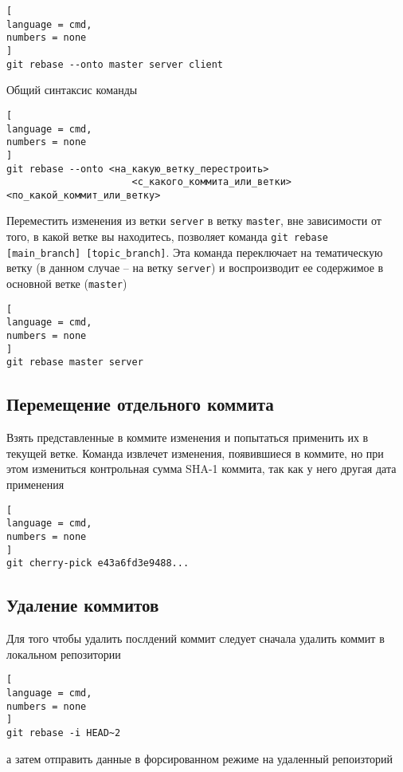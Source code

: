 \documentclass[%
	11pt,
	a4paper,
	utf8,
		]{article}
\begin{document}
\begin{lstlisting}[
language = cmd,
numbers = none
]
git rebase --onto master server client
\end{lstlisting}

Общий синтаксис команды
\begin{lstlisting}[
language = cmd,
numbers = none
]
git rebase --onto <на_какую_ветку_перестроить>
                      <с_какого_коммита_или_ветки> <по_какой_коммит_или_ветку>
\end{lstlisting}

Переместить изменения из ветки \texttt{server} в ветку \texttt{master}, вне зависимости от того, в какой ветке вы находитесь, позволяет команда \texttt{git rebase [main\_branch] [topic\_branch]}. Эта команда переключает на тематическую ветку (в данном случае -- на ветку \texttt{server}) и воспроизводит ее содержимое в основной ветке (\texttt{master})

\begin{lstlisting}[
language = cmd,
numbers = none
]
git rebase master server
\end{lstlisting}


\subsection{Перемещение отдельного коммита}

Взять представленные в коммите изменения и попытаться применить их в текущей ветке. Команда извлечет изменения, появившиеся в коммите, но при этом измениться контрольная сумма SHA-1 коммита, так как у него другая дата применения

\begin{lstlisting}[
language = cmd,
numbers = none
]
git cherry-pick e43a6fd3e9488...
\end{lstlisting}


\subsection{Удаление коммитов}

Для того чтобы удалить послдений коммит следует сначала удалить коммит в локальном репозитории

\begin{lstlisting}[
language = cmd,
numbers = none
]
git rebase -i HEAD~2
\end{lstlisting}
а затем отправить данные в форсированном режиме на удаленный репоизторий
\end{document}
